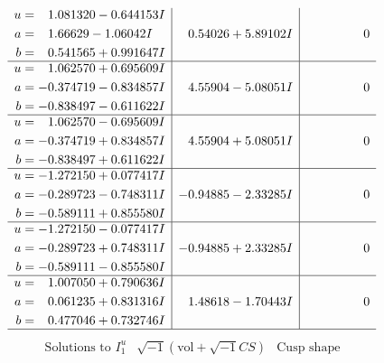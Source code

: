\documentclass[1p]{elsarticle_modified}
\theoremstyle{definition}
\newcommand{\I}{\sqrt{-1}}
\begin{document}
$$\begin{array}{c|c|c}
\begin{aligned}
u &= \phantom{-}1.081320 - 0.644153 I \\
a &= \phantom{-}1.66629 - 1.06042 I \\
b &= \phantom{-}0.541565 + 0.991647 I\end{aligned}
 & \phantom{-}0.54026 + 5.89102 I & \phantom{-0.000000 } 0 \\ \hline\begin{aligned}
u &= \phantom{-}1.062570 + 0.695609 I \\
a &= -0.374719 - 0.834857 I \\
b &= -0.838497 - 0.611622 I\end{aligned}
 & \phantom{-}4.55904 - 5.08051 I & \phantom{-0.000000 } 0 \\ \hline\begin{aligned}
u &= \phantom{-}1.062570 - 0.695609 I \\
a &= -0.374719 + 0.834857 I \\
b &= -0.838497 + 0.611622 I\end{aligned}
 & \phantom{-}4.55904 + 5.08051 I & \phantom{-0.000000 } 0 \\ \hline\begin{aligned}
u &= -1.272150 + 0.077417 I \\
a &= -0.289723 - 0.748311 I \\
b &= -0.589111 + 0.855580 I\end{aligned}
 & -0.94885 - 2.33285 I & \phantom{-0.000000 } 0 \\ \hline\begin{aligned}
u &= -1.272150 - 0.077417 I \\
a &= -0.289723 + 0.748311 I \\
b &= -0.589111 - 0.855580 I\end{aligned}
 & -0.94885 + 2.33285 I & \phantom{-0.000000 } 0 \\ \hline\begin{aligned}
u &= \phantom{-}1.007050 + 0.790636 I \\
a &= \phantom{-}0.061235 + 0.831316 I \\
b &= \phantom{-}0.477046 + 0.732746 I\end{aligned}
 & \phantom{-}1.48618 - 1.70443 I & \phantom{-0.000000 } 0\\
 \hline 
 \end{array}$$\newpage$$\begin{array}{c|c|c}  
\text{Solutions to }I^u_{1}& \I (\text{vol} + \sqrt{-1}CS) & \text{Cusp shape}\\
 \hline 
\begin{aligned}

\end{aligned}
\end{array}$$
\end{document}
